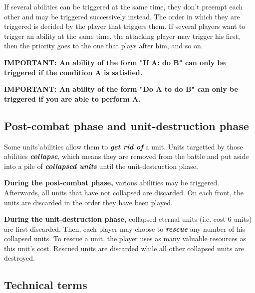 \documentclass[a4paper]{article}
\begin{document}
    If several abilities can be triggered at the same time,
    they don't preempt each other and may be triggered successively instead.
    The order in which they are triggered is decided by the player that triggers them.
    If several players want to trigger an ability at the same time,
    the attacking player may trigger his first,
    then the priority goes to the one that plays after him, and so on.
    
    \hspace{-2em} \textbf{
    IMPORTANT: An ability of the form "\textbf{If} A\textbf{:} do B" can only be
    triggered if the condition A is satisfied.
    }
    
    \hspace{-2em} \textbf{
    IMPORTANT: An ability of the form "Do A \textbf{to} do B" can only be triggered
    if you are able to perform A.
    }
    

\newpage
  \subsection{Post-combat phase and unit-destruction phase}
    
    Some units'abilities allow them to \textbf{\textit{get rid of}} a unit.
    Units targetted by those abilities \textbf{\textit{collapse}},
    which means they are removed from the battle and put aside into a pile
    of \textbf{\textit{collapsed units}} until the unit-destruction phase.
    
    \textbf{During the post-combat phase,} various abilities may be triggered.
    Afterwards, all units that have not collapsed are discarded.
    On each front, the units are discarded in the order they have been played.
    
    \textbf{During the unit-destruction phase,} collapsed eternal units
    (i.e. cost-6 units) are first discarded.
    Then, each player may choose to \textbf{\textit{rescue}}
    any number of his collapsed units.
    To rescue a unit, the player uses as many valuable resources as this unit's cost.
    Rescued units are discarded while all other collapsed units are destroyed.
    

  \subsection{Technical terms}
  
\end{document}
